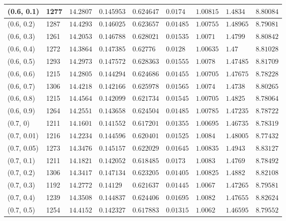 \begin{center}
{\begin{longtable}{| l | p{} |  p{} | p{} | p{} | p{} | p{} | p{} | p{} |}
 (0.6, 0.1) & 1277  & $14.2807$ & $0.145953$ & $0.624647$ & $0.0174$ & $1.00815$ & $1.4834$ & $8.80084$ \\ \hline
 (0.6, 0.2) & 1287  & $14.4293$ & $0.146025$ & $0.623657$ & $0.01485$ & $1.00755$ & $1.48965$ & $8.79081$ \\ \hline
 (0.6, 0.3) & 1261  & $14.2053$ & $0.146788$ & $0.628021$ & $0.01535$ & $1.0071$ & $1.4799$ & $8.80842$ \\ \hline
 (0.6, 0.4) & 1272  & $14.3864$ & $0.147385$ & $0.62776$ & $0.0128$ & $1.00635$ & $1.47$ & $8.81028$ \\ \hline
 (0.6, 0.5) & 1293  & $14.2973$ & $0.147572$ & $0.628363$ & $0.01555$ & $1.0078$ & $1.47485$ & $8.81709$ \\ \hline
 (0.6, 0.6) & 1215  & $14.2805$ & $0.144294$ & $0.624686$ & $0.01455$ & $1.00705$ & $1.47675$ & $8.78228$ \\ \hline
 (0.6, 0.7) & 1306  & $14.4218$ & $0.142166$ & $0.625978$ & $0.01565$ & $1.0074$ & $1.4738$ & $8.80265$ \\ \hline
 (0.6, 0.8) & 1215  & $14.4564$ & $0.142099$ & $0.621734$ & $0.01545$ & $1.00705$ & $1.4825$ & $8.78064$ \\ \hline
 (0.6, 0.9) & 1264  & $14.2551$ & $0.143658$ & $0.624504$ & $0.01485$ & $1.00785$ & $1.47235$ & $8.78722$ \\ \hline
 (0.7, 0) & 1211  & $14.1601$ & $0.141552$ & $0.617201$ & $0.01355$ & $1.00695$ & $1.46735$ & $8.78319$ \\ \hline
 (0.7, 0.01) & 1216  & $14.2234$ & $0.144596$ & $0.620401$ & $0.01525$ & $1.0084$ & $1.48005$ & $8.77432$ \\ \hline
 (0.7, 0.05) & 1273  & $14.3476$ & $0.145157$ & $0.622029$ & $0.01645$ & $1.00835$ & $1.4943$ & $8.83127$ \\ \hline
 (0.7, 0.1) & 1211  & $14.1821$ & $0.142052$ & $0.618485$ & $0.0173$ & $1.0083$ & $1.4769$ & $8.78492$ \\ \hline
 (0.7, 0.2) & 1306  & $14.3417$ & $0.147134$ & $0.623205$ & $0.01405$ & $1.00825$ & $1.4882$ & $8.82108$ \\ \hline
 (0.7, 0.3) & 1192  & $14.2772$ & $0.14129$ & $0.621637$ & $0.01445$ & $1.0067$ & $1.47265$ & $8.79581$ \\ \hline
 (0.7, 0.4) & 1239  & $14.3508$ & $0.144837$ & $0.624406$ & $0.01695$ & $1.0082$ & $1.47655$ & $8.82624$ \\ \hline
 (0.7, 0.5) & 1254  & $14.4152$ & $0.142327$ & $0.617883$ & $0.01315$ & $1.0062$ & $1.46595$ & $8.79552$ \\ \hline

\end{longtable}}
\end{center}
